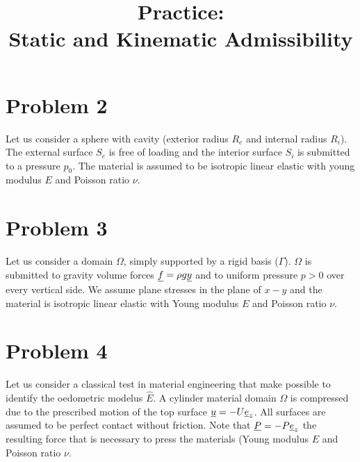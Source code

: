 \documentclass[letter,12pt]{article}
\begin{document}
\pagestyle{fancy}

\title{\textbf{Practice: \\ Static and Kinematic Admissibility}}
\date{}

\maketitle

\vspace{-1cm}


%



\section*{Problem 2}
Let us consider a sphere with cavity (exterior radius $R_e$ and internal radius $R_i$). The external surface $S_e$ is free of loading and the interior surface $S_i$ is submitted to a pressure $p_0$. The material is assumed to be isotropic linear elastic with young modulus $E$ and Poisson ratio $\nu$. \\





\newpage
\section*{Problem 3}
Let us consider a domain $\Omega$, simply supported by a rigid basis ($\Gamma$). $\Omega$ is submitted to gravity volume forces $\underline{f} = \rho g \underline{y} $ and to uniform pressure $p > 0$ over every vertical side. We assume plane stresses in the plane of $x-y$ and the material is isotropic linear elastic with Young modulus $E$ and Poisson ratio $\nu$. \\





\newpage
\section*{Problem 4}
Let us consider a classical test in material engineering that make possible to identify the oedometric  modelus $\hat{E}$. A cylinder material domain $\Omega$ is compressed due to the prescribed motion of the top surface $\underline{u} = -U \underline{e}_z $. All surfaces are assumed to be perfect contact without friction. Note that $\underline{P} = -P \underline{e}_z$ the resulting force that is necessary to press the materials (Young modulus $E$ and Poisson ratio $\nu$. \\
\end{document}
